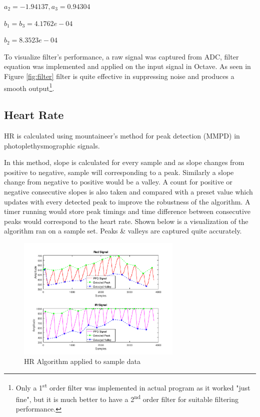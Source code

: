 		$a_2 = -1.94137, a_3 = 0.94304$
		
		$b_1 = b_3 = 4.1762e-04$
		
		$b_2 = 8.3523e-04$
		
		To visualize filter's performance, a raw signal was captured from ADC, filter equation was implemented and applied on the input signal in Octave. As seen in Figure \ref{fig:filter} filter is quite effective in suppressing noise and produces a smooth output\footnote{Only a 1\textsuperscript{st} order filter was implemented in actual program as it worked "just fine", but it is much better to have a 2\textsuperscript{nd} order filter for suitable filtering performance.}.
		
	
	\subsection{Heart Rate}
	
		HR is calculated using mountaineer's method for peak detection (MMPD) in photoplethysmographic signals\cite{mmpd}.
		
		In this method, slope is calculated for every sample and as slope changes from positive to negative, sample will corresponding to a peak. Similarly a slope change from negative to positive would be a valley. A count for positive or negative consecutive slopes is also taken and compared with a preset value which updates with every detected peak to improve the robustness of the algorithm. A timer running would store peak timings and time difference between consecutive peaks would correspond to the heart rate. Shown below is a visualization of the algorithm ran on a sample set. Peaks \& valleys are captured quite accurately.
		
		\begin{figure}[ht!]
			\centering
			\includegraphics[width=0.7\textwidth]{../common/algo/mmpd.png}
			\caption{HR Algorithm applied to sample data}
		\end{figure}
	
